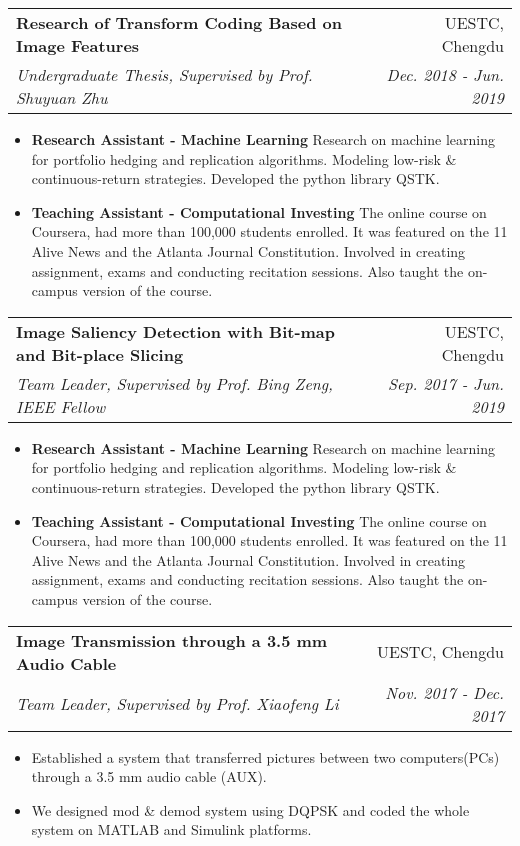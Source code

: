 \documentclass[9pt, a4paper]{article}
\makeatletter
\newcommand{\resumeItem}[2]{
  \item\small{
    \textbf{#1}{ #2 \vspace{-2pt}}
  }
}
\newcommand{\resumeSubheading}[4]{
  \vspace{-1pt}\item
    \begin{tabular*}{0.97\textwidth}{l@{\extracolsep{\fill}}r}
      \textbf{#1} & #2 \\
      \textit{\small#3} & \textit{\small #4} \\
    \end{tabular*}\vspace{-5pt}
}
\newcommand{\resumeItemListStart}{\begin{itemize}}
\newcommand{\resumeItemListEnd}{\end{itemize}\vspace{-5pt}}
\makeatother
\begin{document}

    \resumeSubheading
      {Research of Transform Coding Based on Image Features}{UESTC, Chengdu}
      {Undergraduate Thesis, Supervised by Prof. Shuyuan Zhu}{Dec. 2018 - Jun. 2019}
      \resumeItemListStart
        \resumeItem{Research Assistant - Machine Learning}
          {Research on machine learning for portfolio hedging and replication algorithms. Modeling low-risk \& continuous-return strategies. Developed the python library QSTK.}
        \resumeItem{Teaching Assistant - Computational Investing}
          {The online course on Coursera, had more than 100,000 students enrolled. It was featured on the 11 Alive News and the Atlanta Journal Constitution. Involved in creating assignment, exams and conducting recitation sessions. Also taught the on-campus version of the course.}
      \resumeItemListEnd

    \resumeSubheading
    {Image Saliency Detection with Bit-map and Bit-place Slicing}{UESTC, Chengdu}
    {Team Leader, Supervised by Prof. Bing Zeng, IEEE Fellow}{Sep. 2017 - Jun. 2019}
    \resumeItemListStart
      \resumeItem{Research Assistant - Machine Learning}
        {Research on machine learning for portfolio hedging and replication algorithms. Modeling low-risk \& continuous-return strategies. Developed the python library QSTK.}
      \resumeItem{Teaching Assistant - Computational Investing}
        {The online course on Coursera, had more than 100,000 students enrolled. It was featured on the 11 Alive News and the Atlanta Journal Constitution. Involved in creating assignment, exams and conducting recitation sessions. Also taught the on-campus version of the course.}
    \resumeItemListEnd

    \resumeSubheading
    {Image Transmission through a 3.5 mm Audio Cable}{UESTC, Chengdu}
    {Team Leader, Supervised by Prof. Xiaofeng Li}{Nov. 2017 - Dec. 2017}
    \resumeItemListStart
      \resumeItem{}
        {Established a system that transferred pictures between two computers(PCs) through a 3.5 mm audio cable (AUX).}
      \resumeItem{}
        {We designed mod \& demod system using DQPSK and coded the whole system on MATLAB and Simulink platforms.}
    \resumeItemListEnd
\end{document}
